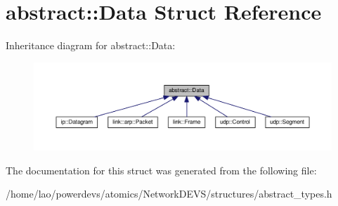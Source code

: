 \hypertarget{structabstract_1_1Data}{}\section{abstract\+:\+:Data Struct Reference}
\label{structabstract_1_1Data}


Inheritance diagram for abstract\+:\+:Data\+:
\nopagebreak
\begin{figure}[H]
\begin{center}
\leavevmode
\includegraphics[width=350pt]{structabstract_1_1Data__inherit__graph}
\end{center}
\end{figure}


The documentation for this struct was generated from the following file\+:\begin{DoxyCompactItemize}
\item 
/home/lao/powerdevs/atomics/\+Network\+D\+E\+V\+S/structures/abstract\+\_\+types.\+h\end{DoxyCompactItemize}
